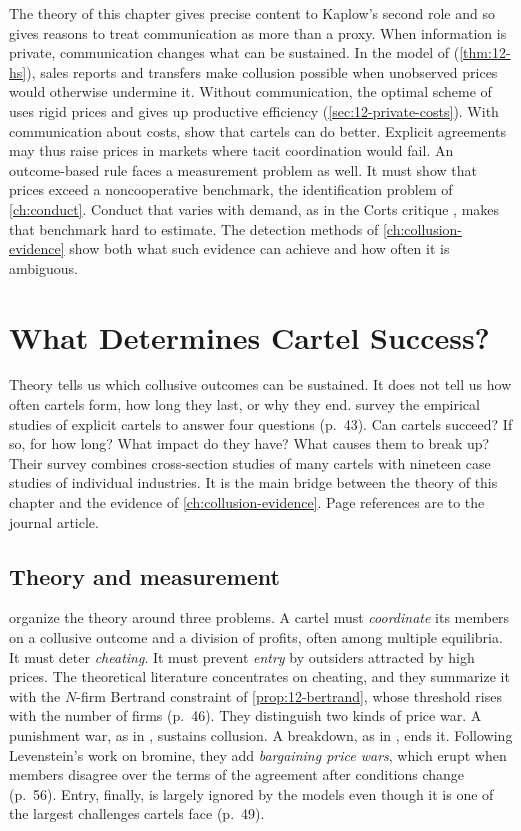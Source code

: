 The theory of this chapter gives precise content to Kaplow's second role and so gives reasons to treat
communication as more than a proxy. When information is private, communication changes what can be sustained. In the
model of \citet{HarringtonSkrzypacz2011}
(\cref{thm:12-hs}), sales reports and transfers make collusion possible when unobserved prices would otherwise
undermine it. Without communication, the optimal scheme of \citet{AtheyBagwellSanchirico2004} uses rigid prices and
gives up productive efficiency (\cref{sec:12-private-costs}). With communication about costs, \citet{AtheyBagwell2001}
show that cartels can do better. Explicit agreements may thus raise prices in markets where tacit coordination would
fail. An outcome-based rule faces a measurement problem as well. It must show that prices exceed a noncooperative
benchmark, the identification problem of \cref{ch:conduct}. Conduct that varies with demand, as in the Corts critique
\citep{Corts1999}, makes that benchmark hard to estimate. The detection methods of \cref{ch:collusion-evidence} show
both what such evidence can achieve and how often it is ambiguous.

\section{What Determines Cartel Success?}\label{sec:12-success}

Theory tells us which collusive outcomes can be sustained. It does not tell us how often cartels form, how long they
last, or why they end. \citet{LevensteinSuslow2006} survey the empirical studies of explicit cartels to answer four
questions (p.~43). Can cartels succeed? If so, for how long? What impact do they have? What causes them to break up?
Their survey combines cross-section studies of many cartels with nineteen case studies of individual industries. It is
the main bridge between the theory of this chapter and the evidence of \cref{ch:collusion-evidence}. Page references
are to the journal article.

\subsection{Theory and measurement}\label{sec:12-ls-measure}

\citet[p.~45]{LevensteinSuslow2006} organize the theory around three problems. A cartel must \emph{coordinate} its
members on a collusive outcome and a division of profits, often among multiple equilibria. It must deter
\emph{cheating}. It must prevent \emph{entry} by outsiders attracted by high prices. The theoretical literature
concentrates on cheating, and they summarize it with the $N$-firm Bertrand constraint of \cref{prop:12-bertrand},
whose threshold rises with the number of firms (p.~46). They distinguish two kinds of price war. A punishment war, as
in \citet{GreenPorter1984}, sustains collusion. A breakdown, as in \citet{Stigler1964}, ends it. Following Levenstein's
work on bromine, they add \emph{bargaining price wars}, which erupt when members disagree over the terms of the
agreement after conditions change (p.~56). Entry, finally, is largely ignored by the models even though it is one of
the largest challenges cartels face (p.~49).

